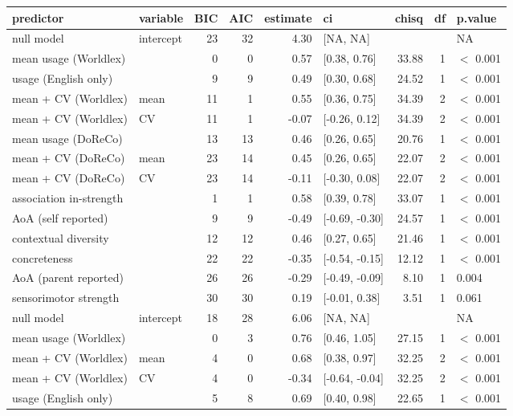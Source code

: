 \begin{table}[ht]
\centering
\begin{tabular}{llrrrlrrl}
  \hline
predictor & variable & BIC & AIC & estimate & ci & chisq & df & p.value \\ 
  \hline
null model & intercept & 23 & 32 & 4.30 & [NA, NA] &  &  & NA \\ 
  mean usage (Worldlex) &  & 0 & 0 & 0.57 & [0.38, 0.76] & 33.88 & 1 & $<$ 0.001 \\ 
  usage (English only) &  & 9 & 9 & 0.49 & [0.30, 0.68] & 24.52 & 1 & $<$ 0.001 \\ 
  mean + CV (Worldlex) & mean & 11 & 1 & 0.55 & [0.36, 0.75] & 34.39 & 2 & $<$ 0.001 \\ 
  mean + CV (Worldlex) & CV & 11 & 1 & -0.07 & [-0.26, 0.12] & 34.39 & 2 & $<$ 0.001 \\ 
  mean usage (DoReCo) &  & 13 & 13 & 0.46 & [0.26, 0.65] & 20.76 & 1 & $<$ 0.001 \\ 
  mean + CV (DoReCo) & mean & 23 & 14 & 0.45 & [0.26, 0.65] & 22.07 & 2 & $<$ 0.001 \\ 
  mean + CV (DoReCo) & CV & 23 & 14 & -0.11 & [-0.30, 0.08] & 22.07 & 2 & $<$ 0.001 \\ 
  association in-strength &  & 1 & 1 & 0.58 & [0.39, 0.78] & 33.07 & 1 & $<$ 0.001 \\ 
  AoA (self reported) &  & 9 & 9 & -0.49 & [-0.69, -0.30] & 24.57 & 1 & $<$ 0.001 \\ 
  contextual diversity &  & 12 & 12 & 0.46 & [0.27, 0.65] & 21.46 & 1 & $<$ 0.001 \\ 
  concreteness &  & 22 & 22 & -0.35 & [-0.54, -0.15] & 12.12 & 1 & $<$ 0.001 \\ 
  AoA (parent reported) &  & 26 & 26 & -0.29 & [-0.49, -0.09] & 8.10 & 1 & 0.004 \\ 
  sensorimotor strength &  & 30 & 30 & 0.19 & [-0.01, 0.38] & 3.51 & 1 & 0.061 \\ 
  null model & intercept & 18 & 28 & 6.06 & [NA, NA] &  &  & NA \\ 
  mean usage (Worldlex) &  & 0 & 3 & 0.76 & [0.46, 1.05] & 27.15 & 1 & $<$ 0.001 \\ 
  mean + CV (Worldlex) & mean & 4 & 0 & 0.68 & [0.38, 0.97] & 32.25 & 2 & $<$ 0.001 \\ 
  mean + CV (Worldlex) & CV & 4 & 0 & -0.34 & [-0.64, -0.04] & 32.25 & 2 & $<$ 0.001 \\ 
  usage (English only) &  & 5 & 8 & 0.69 & [0.40, 0.98] & 22.65 & 1 & $<$ 0.001 \\ 

\end{tabular}
\end{table}
